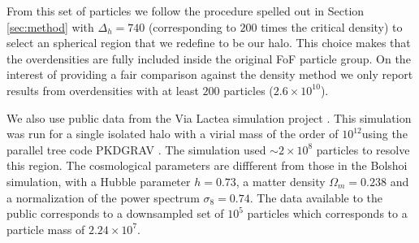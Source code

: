 \documentclass{emulateapj}
\newcommand{\hMsun}{{\ifmmode{h^{-1}{\rm {M_{\odot}}}}\else{$h^{-1}{\rm{M_{\odot}}}$}\fi}}
\begin{document}
From this set of particles we follow the procedure spelled out in
Section \ref{sec:method} with $\Delta_h=740$ (corresponding to $200$
times the critical density) to select an spherical region that we
redefine to be our halo.  
This choice makes that the overdensities are fully included inside the
original FoF particle group.   
On the interest of providing a fair comparison against the density
method we only report results from overdensities with at least $200$
particles ($2.6\times 10^{10}$\hMsun). 

We also use public data from the Via Lactea simulation project
\citep{2008Natur.454..735D}.  
This simulation was run for a single isolated halo with a virial mass
of the order of $10^{12}$\hMsun using the parallel tree code PKDGRAV
\citep{2001PhDT........21S}.  
The simulation used $\sim 2\times 10^{8}$ particles to resolve this
region.
The cosmological parameters are diffferent from those in the Bolshoi
simulation, with a Hubble parameter $h=0.73$, a matter density
$\Omega_m=0.238$ and a normalization of the power spectrum
$\sigma_8=0.74$. 
The data available to the public corresponds to a downsampled set 
of $10^5$ particles which corresponds to a particle mass of
$2.24\times 10^{7}$\hMsun.  
\end{document}
